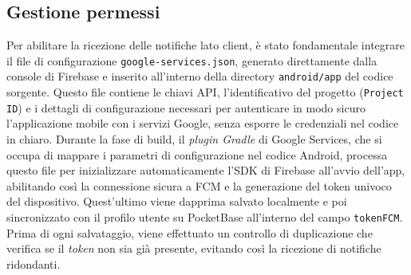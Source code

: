 \documentclass[12pt,a4paper]{article}
\begin{document}
\newpage

\subsection{Gestione permessi}

Per abilitare la ricezione delle notifiche lato client, 
è stato fondamentale integrare 
il file di configurazione \texttt{google-services.json}, 
generato direttamente dalla console di Firebase 
e inserito all'interno della directory \texttt{android/app} del codice sorgente.
Questo file contiene le chiavi API, l'identificativo del progetto (\texttt{Project ID}) 
e i dettagli di configurazione necessari per autenticare in modo sicuro 
l'applicazione mobile con i servizi Google, 
senza esporre le credenziali nel codice in chiaro. 
Durante la fase di build, il \textit{plugin Gradle} di Google Services,
che si occupa di mappare i parametri di configurazione nel codice Android,
processa questo file per inizializzare automaticamente 
l'SDK di Firebase all'avvio dell'app,
abilitando così la connessione sicura a FCM 
e la generazione del token univoco del dispositivo.
Quest'ultimo viene dapprima salvato localmente 
e poi sincronizzato con il profilo utente su PocketBase 
all'interno del campo \texttt{tokenFCM}. 
Prima di ogni salvataggio, viene effettuato un controllo di duplicazione 
che verifica se il \textit{token} non sia già presente, 
evitando così la ricezione di notifiche ridondanti.
\end{document}
